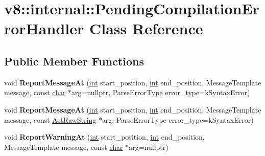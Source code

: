 \hypertarget{classv8_1_1internal_1_1PendingCompilationErrorHandler}{}\section{v8\+:\+:internal\+:\+:Pending\+Compilation\+Error\+Handler Class Reference}
\label{classv8_1_1internal_1_1PendingCompilationErrorHandler}
\subsection*{Public Member Functions}
\begin{DoxyCompactItemize}
\item 
\mbox{\label{classv8_1_1internal_1_1PendingCompilationErrorHandler_a5b1ea504204fdc432e8d40ec86a947e1}} 
void {\bfseries Report\+Message\+At} (\mbox{\hyperlink{classint}{int}} start\+\_\+position, \mbox{\hyperlink{classint}{int}} end\+\_\+position, Message\+Template message, const \mbox{\hyperlink{classchar}{char}} $\ast$arg=nullptr, Parse\+Error\+Type error\+\_\+type=k\+Syntax\+Error)
\item 
\mbox{\label{classv8_1_1internal_1_1PendingCompilationErrorHandler_a42f2a234084f9990ce8a29498676bc3c}} 
void {\bfseries Report\+Message\+At} (\mbox{\hyperlink{classint}{int}} start\+\_\+position, \mbox{\hyperlink{classint}{int}} end\+\_\+position, Message\+Template message, const \mbox{\hyperlink{classv8_1_1internal_1_1AstRawString}{Ast\+Raw\+String}} $\ast$arg, Parse\+Error\+Type error\+\_\+type=k\+Syntax\+Error)
\item 
\mbox{\label{classv8_1_1internal_1_1PendingCompilationErrorHandler_a1f2426240db9aa431bde93f7f29d61bb}} 
void {\bfseries Report\+Warning\+At} (\mbox{\hyperlink{classint}{int}} start\+\_\+position, \mbox{\hyperlink{classint}{int}} end\+\_\+position, Message\+Template message, const \mbox{\hyperlink{classchar}{char}} $\ast$arg=nullptr)
\item 
\mbox{\label{classv8_1_1internal_1_1PendingCompilationErrorHandler_a693897b31a85741888860c77fc44e9ce}} 

\end{DoxyCompactItemize}
